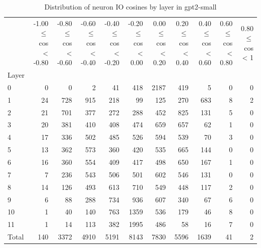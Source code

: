 \begin{table}
\caption{Distribution of neuron IO cosines by layer in gpt2-small}
\label{tab:gpt2-small_half_coarse}
\begin{tabular}{lrrrrrrrrrr}
 & -1.00 $\leq$ cos < -0.80 & -0.80 $\leq$ cos < -0.60 & -0.60 $\leq$ cos < -0.40 & -0.40 $\leq$ cos < -0.20 & -0.20 $\leq$ cos < 0.00 & 0.00 $\leq$ cos < 0.20 & 0.20 $\leq$ cos < 0.40 & 0.40 $\leq$ cos < 0.60 & 0.60 $\leq$ cos < 0.80 & 0.80 $\leq$ cos < 1 \\
Layer &  &  &  &  &  &  &  &  &  &  \\
0 & 0 & 0 & 2 & 41 & 418 & 2187 & 419 & 5 & 0 & 0 \\
1 & 24 & 728 & 915 & 218 & 99 & 125 & 270 & 683 & 8 & 2 \\
2 & 21 & 701 & 377 & 272 & 288 & 452 & 825 & 131 & 5 & 0 \\
3 & 20 & 381 & 410 & 408 & 474 & 659 & 657 & 62 & 1 & 0 \\
4 & 17 & 336 & 502 & 485 & 526 & 594 & 539 & 70 & 3 & 0 \\
5 & 13 & 362 & 573 & 360 & 420 & 535 & 665 & 144 & 0 & 0 \\
6 & 16 & 360 & 554 & 409 & 417 & 498 & 650 & 167 & 1 & 0 \\
7 & 7 & 236 & 543 & 506 & 501 & 602 & 546 & 131 & 0 & 0 \\
8 & 14 & 126 & 493 & 613 & 710 & 549 & 448 & 117 & 2 & 0 \\
9 & 6 & 88 & 288 & 734 & 936 & 607 & 340 & 67 & 6 & 0 \\
10 & 1 & 40 & 140 & 763 & 1359 & 536 & 179 & 46 & 8 & 0 \\
11 & 1 & 14 & 113 & 382 & 1995 & 486 & 58 & 16 & 7 & 0 \\
Total & 140 & 3372 & 4910 & 5191 & 8143 & 7830 & 5596 & 1639 & 41 & 2 \\
\end{tabular}
\end{table}

